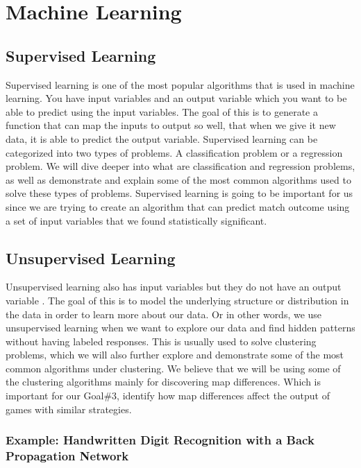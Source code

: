 \documentclass[a4paper,12pt]{report}
\begin{document}
\section{Machine Learning}
\subsection{Supervised Learning}

Supervised learning is one of the most popular algorithms that is used in machine learning. You have input variables and an output variable  which you want to be able to predict using the input variables. The goal of this is to generate a function that can map the inputs to output so well, that when we give it new data, it is able to predict the output variable. Supervised learning can be categorized into two types of problems. A classification problem or a regression problem. We will dive deeper into what are classification and regression problems, as well as demonstrate and explain some of the most common algorithms used to solve these types of problems. Supervised learning is going to be important for us since we are trying to create an algorithm that can predict match outcome using a set of input variables that we found statistically significant.

\subsection{Unsupervised Learning}

Unsupervised learning also has input variables  but they do not have an output variable . The goal of this is to model the underlying structure or distribution in the data in order to learn more about our data. Or in other words, we use unsupervised learning when we want to explore our data and find hidden patterns without having labeled responses. This is usually used to solve clustering problems, which we will also further explore and demonstrate some of the most common algorithms under clustering. We believe that we will be using some of the clustering algorithms mainly for discovering map differences. Which is important for our Goal\#3, identify how map differences affect the output of games with similar strategies.

\subsubsection{Example: Handwritten Digit Recognition with a Back Propagation Network}
\end{document}
